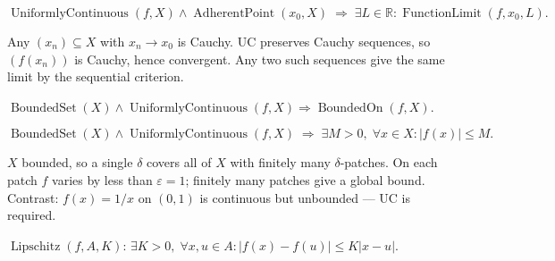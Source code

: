 \begin{remark*}
\[
  \operatorname{UniformlyContinuous}(f,X)
  \wedge \operatorname{AdherentPoint}(x_0,X)
  \;\Rightarrow\;
  \exists L\in\mathbb{R}:\operatorname{FunctionLimit}(f,x_0,L).
\]
\end{remark*}

\begin{remark*}[Interpretation]
Any $(x_n)\subseteq X$ with $x_n\to x_0$ is Cauchy. UC preserves
Cauchy sequences, so $(f(x_n))$ is Cauchy, hence convergent. Any
two such sequences give the same limit by the sequential criterion.
\end{remark*}


\begin{proposition}
\label{prop:uniform-continuity-bounded-image}
$\operatorname{BoundedSet}(X)\wedge\operatorname{UniformlyContinuous}(f,X)
\Rightarrow\operatorname{BoundedOn}(f,X)$.
\end{proposition}

\begin{remark*}
\[
  \operatorname{BoundedSet}(X)\wedge\operatorname{UniformlyContinuous}(f,X)
  \;\Rightarrow\;
  \exists M>0,\;\forall x\in X:|f(x)|\leq M.
\]
\end{remark*}

\begin{remark*}[Interpretation]
$X$ bounded, so a single $\delta$ covers all of $X$ with finitely
many $\delta$-patches. On each patch $f$ varies by less than
$\varepsilon=1$; finitely many patches give a global bound. Contrast:
$f(x)=1/x$ on $(0,1)$ is continuous but unbounded — UC is required.
\end{remark*}


\begin{tcolorbox}[title={Definition --- Lipschitz Condition}]
\begin{definition}
\label{def:lipschitz-condition}
$\operatorname{Lipschitz}(f,A,K)$: $\exists K>0,\;\forall x,u\in A:
|f(x)-f(u)|\leq K|x-u|$.
\end{definition}
\end{tcolorbox}

